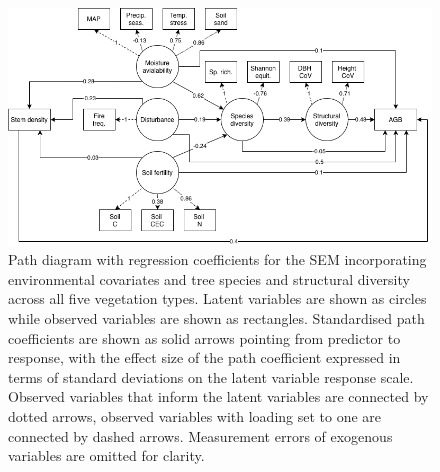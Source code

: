 \documentclass[11pt,a4paper]{article}
\begin{document}
\begin{figure}[H]
\centering
	\includegraphics[width=\textwidth]{full}
	\caption{Path diagram with regression coefficients for the SEM incorporating environmental covariates and tree species and structural diversity across all five vegetation types. Latent variables are shown as circles while observed variables are shown as rectangles. Standardised path coefficients are shown as solid arrows pointing from predictor to response, with the effect size of the path coefficient expressed in terms of standard deviations on the latent variable response scale. Observed variables that inform the latent variables are connected by dotted arrows, observed variables with loading set to one are connected by dashed arrows. Measurement errors of exogenous variables are omitted for clarity.}
	\label{full_mod}
\end{figure}
\end{document}

